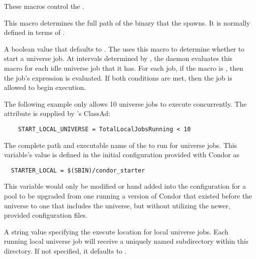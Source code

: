 These macros control the .
\begin{description}

\label{param:Shadow}
\item[\Macro{SHADOW}]
  This macro determines the
  full path of the  binary that the 
  spawns.  It is normally defined in terms of . 
  
\label{param:StartLocalUniverse}
\item[\Macro{START\_LOCAL\_UNIVERSE}]
  A boolean value that defaults to .
  The  uses this macro to determine whether to start
  a  universe job. 
  At intervals determined by , 
  the  daemon evaluates this macro
  for each idle  universe job that it has.
  For each job, if the  
  macro is , then the job's  expression
  is evaluated. If both conditions are met, then the job is allowed
  to begin execution. 
  
  The following example only allows 10  universe jobs to
  execute concurrently. The attribute 
  is supplied by 's ClassAd:
  
  \footnotesize
  \begin{verbatim}
    START_LOCAL_UNIVERSE = TotalLocalJobsRunning < 10
  \end{verbatim}
  \normalsize
  
\label{param:StarterLocal}
\item[\Macro{STARTER\_LOCAL}]
  The complete path and executable name of the  to
  run for  universe jobs.  This variable's value
  is defined in the initial configuration provided with Condor as
  \footnotesize
  \begin{verbatim}
  STARTER_LOCAL = $(SBIN)/condor_starter
  \end{verbatim}
  \normalsize
  This variable would only be modified or hand added into 
  the configuration for a pool to be upgraded from one
  running a version of Condor that existed before the
   universe to one that includes the
   universe, but without utilizing the newer, provided
  configuration files.

\label{param:LocalUnivExecute}
\item[\Macro{LOCAL\_UNIV\_EXECUTE}]
  A string value specifying the execute location for local
  universe jobs.  Each running local universe job will receive a
  uniquely named subdirectory within this directory.
  If not specified, it defaults to .


\end{description}
